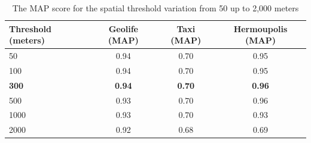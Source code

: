 \begin{table}[ht!]
  \scriptsize
  \centering
  \begin{tabular}{|l|c|c|c|}
  \hline
Threshold (meters) & Geolife (MAP) & Taxi (MAP) & Hermoupolis (MAP)\\
  \hline
50 & {0.94} & 0.70 & 0.95\\
100 & {0.94} & 0.70 & 0.95\\
\textbf{300} & \textbf{0.94} & \textbf{0.70} & \textbf{0.96} \\
500 & 0.93 & 0.70 & {0.96}\\
1000 & 0.93 & 0.70 & 0.93\\
2000 & 0.92 & 0.68 & 0.69\\
    \hline
  \end{tabular}
  \caption{The MAP score for the spatial threshold variation from 50 up to 2,000 meters}
  \label{tab:sensibility_spatial_thresholds}
\end{table}